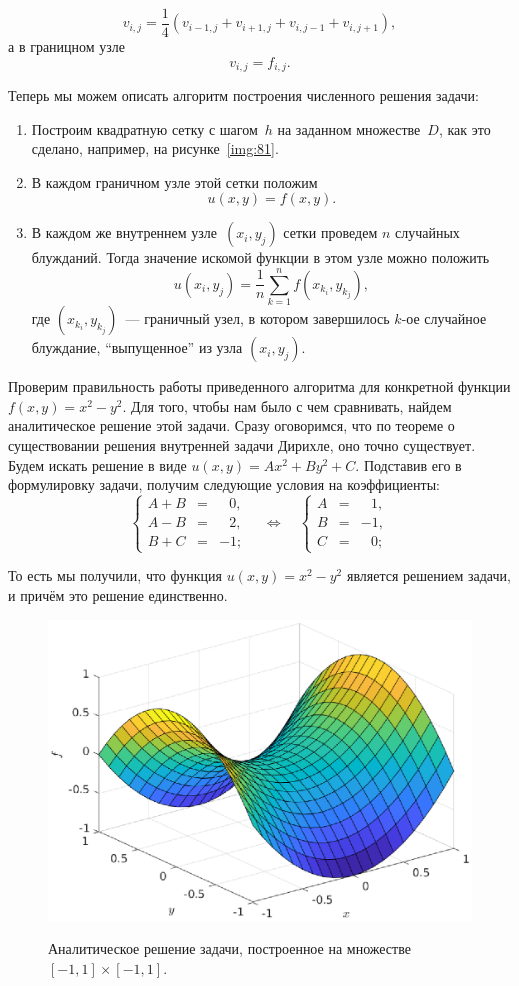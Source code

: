 $$
v_{i,j}=\frac{1}{4}(v_{i-1,j}+v_{i+1,j}+v_{i,j-1}+v_{i,j+1}),
$$
а в границном узле
$$
v_{i,j}=f_{i,j}.
$$

Теперь мы можем описать алгоритм построения численного решения задачи:

\begin{enumerate}
        \item Построим квадратную сетку с шагом~$h$ на заданном множестве~$D$, как это сделано, например, на рисунке~\ref{img:81}.
        \item В каждом граничном узле этой сетки положим
$$
        u(x,y) = f(x,y).
$$ 
        \item В каждом же внутреннем узле~$(x_i,y_j)$ сетки проведем $n$ случайных блужданий. Тогда значение искомой функции в этом узле можно положить
$$
        u(x_i, y_j) = \frac{1}{n} \sum_{k=1}^{n} f(x_{k_i}, y_{k_j}), 
$$
        где $(x_{k_i}, y_{k_j})$~--- граничный узел, в котором завершилось $k$-ое случайное блуждание, ``выпущенное'' из узла $(x_i,y_j)$.
\end{enumerate}


Проверим правильность работы приведенного алгоритма для конкретной функции
$f(x,y) = x^2 - y^2$.
Для того, чтобы нам было с чем сравнивать, найдем аналитическое решение этой задачи.
Сразу оговоримся, что по теореме о существовании решения внутренней задачи Дирихле, оно точно существует.
Будем искать решение в виде
$u(x,y)=Ax^2+By^2+C$.
Подставив его в формулировку задачи, получим следующие условия на коэффициенты:
\[
\left\lbrace
\begin{array}{rcl}
A+B&=&\;\;\,0,\\
A-B&=&\;\;\,2,\\
B+C&=&-1;
\end{array}
\right.\quad\Longleftrightarrow\quad
\left\lbrace
\begin{array}{rcl}
A&=&\;\;\,1,\\
B&=&-1,\\
C&=&\;\;\,0;
\end{array}
\right.
\]

То есть мы получили, что функция
$u(x,y)=x^2-y^2$
является решением задачи, и причём это решение единственно.

\clearpage

\begin{figure}[t]
        \noindent
        \centering
        {
                \includegraphics[width=120mm]{task_08/anal.eps}
        }
        \caption{Аналитическое решение задачи, построенное на множестве $[-1,1]\times[-1,1]$.}
\end{figure}